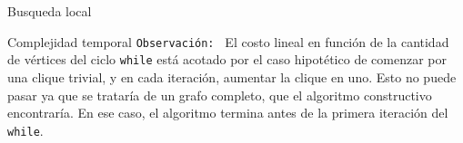 \begin{section}{Busqueda local}
\begin{subsection}{Complejidad temporal}
			\texttt{Observación: } El costo lineal en función de la cantidad de vértices del ciclo \texttt{while} está acotado por el caso hipotético de comenzar por una clique trivial, y en cada iteración, aumentar la clique en uno. Esto no puede pasar ya que se trataría de un grafo completo, que el algoritmo constructivo encontraría. En ese caso, el algoritmo termina antes de la primera iteración del \texttt{while}.
		\end{subsection}
\end{section}



